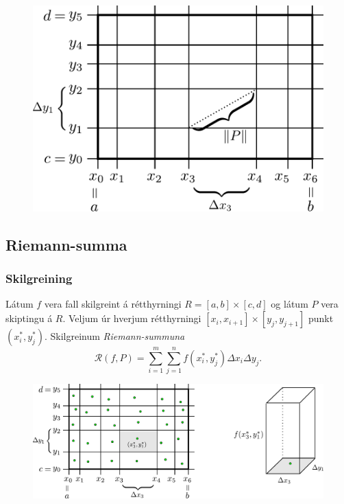 \bigskip
 \begin{figure}[h!]
 \centering
            \includegraphics[width=.5\linewidth]{skipting.png}
            \caption*{}
\end{figure}



\subsection{Riemann-summa} 

\subsubsection{Skilgreining }
  
 Látum $f$ vera fall skilgreint á rétthyrningi $R=[a,b]\times[c,d]$ og
 látum $P$ vera skiptingu á $R$.  Veljum úr hverjum rétthyrningi
 $[x_i,x_{i+1}]\times [y_j,y_{j+1}]$ punkt $(x_i^*, y_j^*)$.  
Skilgreinum \emph{Riemann-summuna}
$$\mathcal{R}(f,P)=\sum_{i=1}^m\sum_{j=1}^n f(x_i^*, y_j^*)\Delta x_i\Delta
  y_j.$$

   \begin {figure}[h!]
 \centering
            \includegraphics[width=.95\linewidth]{skipting2.pdf}
            \caption*{}
\end {figure}




